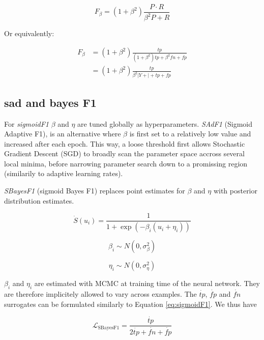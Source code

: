 
\begin{equation}
F_{\beta}=\left(1+\beta^{2}\right) \frac{P \cdot R}{\beta^{2} P+R}
\end{equation}

Or equivalently:

\begin{equation}
\begin{aligned} F_{\beta} &=\left(1+\beta^{2}\right) \frac{t p}{\left(1+\beta^{2}\right) t p+\beta^{2} f n+f p} \\ &=\left(1+\beta^{2}\right) \frac{t p}{\beta^{2}|Y+|+t p+f p} \end{aligned}
\end{equation}


\subsection{sad and bayes F1}



For \emph{sigmoidF1} \(\beta\) and \(\eta\) are tuned globally as hyperparameters. \emph{SAdF1} (Sigmoid Adaptive F1), is an alternative where \(\beta\) is first set to a relatively low value and increased after each epoch. This way, a loose threshold first allows Stochastic Gradient Descent (SGD) to broadly scan the parameter space accross several local minima, before narrowing parameter search down to a promissing region (similarily to adaptive learning rates).

\emph{SBayesF1} (sigmoid Bayes F1) replaces point estimates for \(\beta\) and \(\eta\) with posterior distribution estimates. 

\begin{equation}
\dot{S}(u_i) = \frac{1}{1+\exp (-\beta_i (u_i + \eta_i))}
\end{equation}

$$ \beta_i \sim N(0, \sigma^{2}_{\beta}) $$

$$ \eta_i \sim N(0, \sigma^{2}_{\eta}) $$

\(\beta_i\) and \(\eta_i\) are estimated with MCMC at training time of the neural network. They are therefore implicitely allowed to vary across examples. The \(\dot{tp}\), \(\dot{fp}\) and \(\dot{fn}\) surrogates can be formulated similarly to Equation \ref{eq:sigmoidF1}. We thus have

\begin{equation}
\mathcal{L}_{\text {SBayesF1}}= \frac{\dot{tp}}{2 \dot{tp}+ \dot{fn}+ \dot{fp}}
\end{equation}



